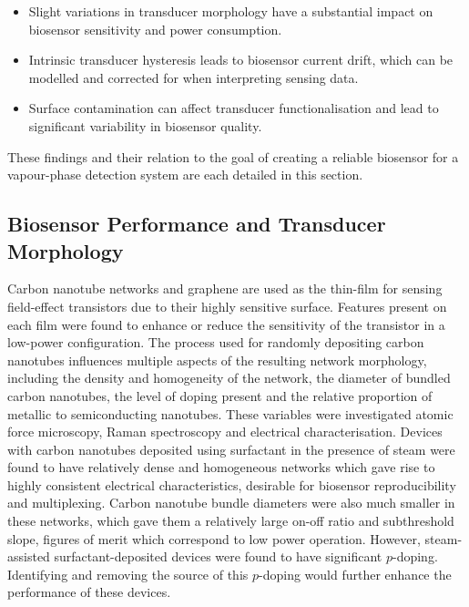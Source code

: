 \documentclass[
  a4paper,
]{scrbook}
\begin{document}
\begin{itemize}
\item
  Slight variations in transducer morphology have a substantial impact
  on biosensor sensitivity and power consumption.
\item
  Intrinsic transducer hysteresis leads to biosensor current drift,
  which can be modelled and corrected for when interpreting sensing
  data.
\item
  Surface contamination can affect transducer functionalisation and lead
  to significant variability in biosensor quality.
\end{itemize}

These findings and their relation to the goal of creating a reliable
biosensor for a vapour-phase detection system are each detailed in this
section.

\hypertarget{biosensor-performance-and-transducer-morphology}{%
\subsection{Biosensor Performance and Transducer
Morphology}\label{biosensor-performance-and-transducer-morphology}}

Carbon nanotube networks and graphene are used as the thin-film for
sensing field-effect transistors due to their highly sensitive surface.
Features present on each film were found to enhance or reduce the
sensitivity of the transistor in a low-power configuration. The process
used for randomly depositing carbon nanotubes influences multiple
aspects of the resulting network morphology, including the density and
homogeneity of the network, the diameter of bundled carbon nanotubes,
the level of doping present and the relative proportion of metallic to
semiconducting nanotubes. These variables were investigated atomic force
microscopy, Raman spectroscopy and electrical characterisation. Devices
with carbon nanotubes deposited using surfactant in the presence of
steam were found to have relatively dense and homogeneous networks which
gave rise to highly consistent electrical characteristics, desirable for
biosensor reproducibility and multiplexing. Carbon nanotube bundle
diameters were also much smaller in these networks, which gave them a
relatively large on-off ratio and subthreshold slope, figures of merit
which correspond to low power operation. However, steam-assisted
surfactant-deposited devices were found to have significant
\(p\)-doping. Identifying and removing the source of this \(p\)-doping
would further enhance the performance of these devices.
\end{document}
